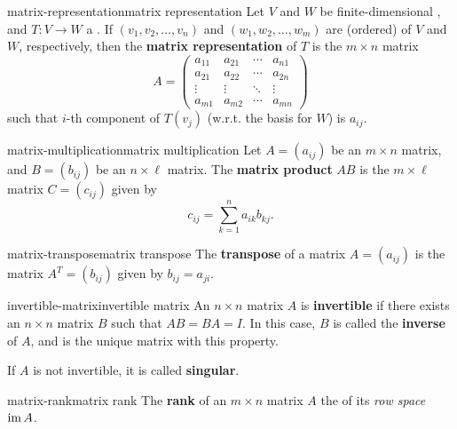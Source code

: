 \begin{topic}{matrix-representation}{matrix representation}
    Let $V$ and $W$ be finite-dimensional , and $T : V \to W$ a . If $(v_1, v_2, \ldots, v_n)$ and $(w_1, w_2, \ldots, w_m)$ are (ordered)  of $V$ and $W$, respectively, then the \textbf{matrix representation} of $T$ is the $m \times n$ matrix
    \[ A = \begin{pmatrix} a_{11} & a_{21} & \cdots & a_{n1} \\ a_{21} & a_{22} & \cdots & a_{2n} \\ \vdots & \vdots & \ddots & \vdots \\ a_{m1} & a_{m2} & \cdots & a_{mn} \end{pmatrix} \]
    such that $i$-th component of $T(v_j)$ (w.r.t. the basis for $W$) is $a_{ij}$.
\end{topic}

\begin{topic}{matrix-multiplication}{matrix multiplication}
    Let $A = (a_{ij})$ be an $m \times n$ matrix, and $B = (b_{ij})$ be an $n \times \ell$ matrix. The \textbf{matrix product} $AB$ is the $m \times \ell$ matrix $C = (c_{ij})$ given by
    \[  c_{ij} = \sum_{k = 1}^{n} a_{ik} b_{kj} . \]
\end{topic}

\begin{topic}{matrix-transpose}{matrix transpose}
    The \textbf{transpose} of a matrix $A = (a_{ij})$ is the matrix $A^T = (b_{ij})$ given by $b_{ij} = a_{ji}$.
\end{topic}

    

\begin{topic}{invertible-matrix}{invertible matrix}
    An $n \times n$ matrix $A$ is \textbf{invertible} if there exists an $n \times n$ matrix $B$ such that $AB = BA = I$. In this case, $B$ is called the \textbf{inverse} of $A$, and is the unique matrix with this property.
    
    If $A$ is not invertible, it is called \textbf{singular}.
\end{topic}

\begin{topic}{matrix-rank}{matrix rank}
    The \textbf{rank} of an $m \times n$ matrix $A$ the  of its \textit{row space} $\operatorname{im} A$.
\end{topic}

